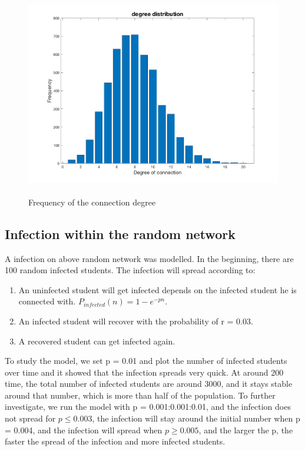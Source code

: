 \documentclass[12pt]{article}
\begin{document}
\begin{figure}[H] %
\centering
\includegraphics[width = 12 cm, height = 9cm]{randomf.png}
\caption{Frequency of the connection degree}
\label{fig:randomconnect}
\end{figure}

\newpage
\subsection{Infection within the random network}

A infection on above random network was modelled. In the beginning, there are 100 random infected students. The infection will spread according to:

\begin{enumerate}
\item An uninfected student will get infected depends on the infected student he is connected with. $P_{infected}(n) = 1 - e^{-pn}$.  
\item An infected student will recover with the probability of r = 0.03.
\item A recovered student can get infected again. 
\end{enumerate}

To study the model, we set p = 0.01 and plot the number of infected students over time and it showed that the infection spreads very quick. At around 200 time, the total number of infected students are around 3000, and it stays stable around that number, which is more than half of the population. To further investigate, we run the model with p = 0.001:0.001:0.01, and the infection does not spread for $p \leq 0.003$, the infection will stay around the initial number when p = 0.004, and the infection will spread when $p \geq 0.005$, and the larger the p, the faster the spread of the infection and more infected students. \par
\end{document}
